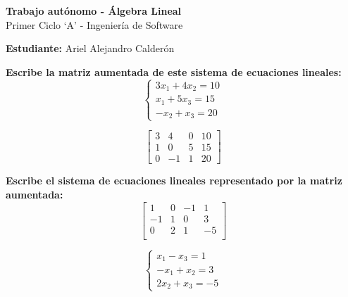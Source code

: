 \documentclass[answers]{exam} %
\begin{document}
\begin{center}
	\large\textbf{Trabajo autónomo - Álgebra Lineal}\\[1em]
	\large Primer Ciclo \enquote*{A} - Ingeniería de Software\\[1em]
\end{center}

\vspace{0.5cm}
\large\textbf{Estudiante:} Ariel Alejandro Calderón
\vspace{0.5cm}

\begin{questions}

	\question \large\textbf{Escribe la matriz aumentada de este sistema de ecuaciones lineales:
		\[
			\left\{
			\begin{array}{l}
				3x_1 + 4x_2 = 10 \\
				x_1 + 5x_3 = 15  \\
				-x_2 + x_3 = 20
			\end{array}
			\right.
		\]}
	\begin{solution}
		\[
			\left[
				\begin{array}{ccc|c}
					3 & 4  & 0 & 10 \\
					1 & 0  & 5 & 15 \\
					0 & -1 & 1 & 20
				\end{array}
				\right]
		\]
	\end{solution}

	\vspace{0.5cm}

	\question \large\textbf{Escribe el sistema de ecuaciones lineales representado por la matriz aumentada:
		\[
			\left[
				\begin{array}{ccc|c}
					{1}  & {0} & {-1} & 1  \\
					{-1} & {1} & {0}  & 3  \\
					{0}  & {2} & {1}  & -5 \\
				\end{array}
				\right]\]
	}
	\begin{solution}
		\[
			\left\{
			\begin{array}{l}
				x_1 - x_3 = 1  \\
				-x_1 + x_2 = 3 \\
				2x_2 + x_3 = -5
			\end{array}
			\right.
		\]
	\end{solution}

	\vspace{0.5cm}


\end{questions}
\end{document}

